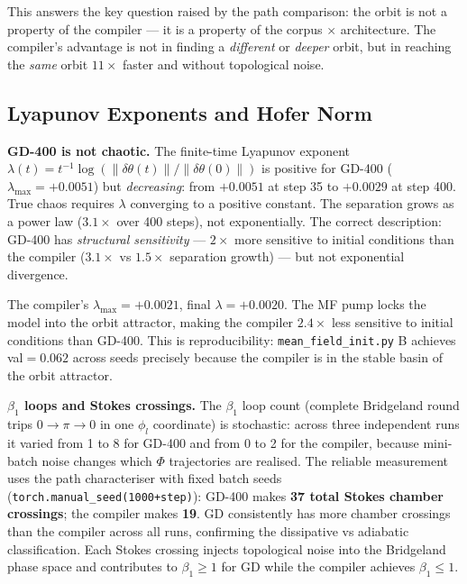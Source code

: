 \documentclass[11pt]{amsart}
\begin{document}
This answers the key question raised by the path comparison:
the orbit is not a property of the compiler --- it is a property
of the corpus $\times$ architecture.
The compiler's advantage is not in finding a \emph{different} or
\emph{deeper} orbit, but in reaching the \emph{same} orbit
$11\times$ faster and without topological noise.

\subsection{Lyapunov Exponents and Hofer Norm}

\textbf{GD-400 is not chaotic.}
The finite-time Lyapunov exponent
$\lambda(t) = t^{-1}\log(\|\delta\theta(t)\|/\|\delta\theta(0)\|)$
is positive for GD-400 ($\lambda_\mathrm{max} = +0.0051$)
but \emph{decreasing}: from $+0.0051$ at step 35 to $+0.0029$ at step 400.
True chaos requires $\lambda$ converging to a positive constant.
The separation grows as a power law ($3.1\times$ over 400 steps),
not exponentially.
The correct description: GD-400 has \emph{structural sensitivity}
--- $2\times$ more sensitive to initial conditions than the compiler
($3.1\times$ vs $1.5\times$ separation growth)
--- but not exponential divergence.

The compiler's $\lambda_\mathrm{max} = +0.0021$, final $\lambda = +0.0020$.
The MF pump locks the model into the orbit attractor, making the
compiler $2.4\times$ less sensitive to initial conditions than GD-400.
This is reproducibility: \texttt{mean\_field\_init.py} B achieves
val$=0.062$ across seeds precisely because the compiler is in the
stable basin of the orbit attractor.

\textbf{$\beta_1$ loops and Stokes crossings.}
The $\beta_1$ loop count (complete Bridgeland round trips
$0\to\pi\to 0$ in one $\phi_l$ coordinate) is stochastic:
across three independent runs it varied from 1 to 8 for GD-400
and from 0 to 2 for the compiler, because mini-batch noise
changes which $\Phi$ trajectories are realised.
The reliable measurement uses the path characteriser with fixed
batch seeds (\texttt{torch.manual\_seed(1000+step)}):
GD-400 makes \textbf{37 total Stokes chamber crossings};
the compiler makes \textbf{19}.
GD consistently has more chamber crossings than the compiler
across all runs, confirming the dissipative vs adiabatic classification.
Each Stokes crossing injects topological noise into the
Bridgeland phase space and contributes to $\beta_1 \geq 1$
for GD while the compiler achieves $\beta_1 \leq 1$.
\end{document}
